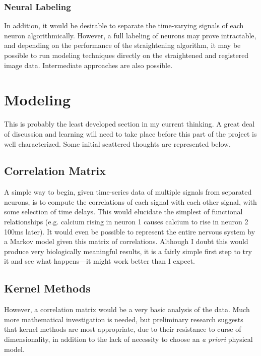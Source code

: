 \documentclass[letter,11pt]{article}
\begin{document}
\subsubsection{Neural Labeling}

In addition, it would be desirable to separate the time-varying signals of each neuron
algorithmically. However, a full labeling of neurons may prove intractable, and depending
on the performance of the straightening algorithm, it may be possible to run modeling
techniques directly on the straightened and registered image data. Intermediate approaches
are also possible.


\section{Modeling}


This is probably the least developed section in my current thinking. A great deal
of discussion and learning will need to take place before this part of the project is
well characterized. Some initial scattered thoughts are represented below.

\subsection{Correlation Matrix}

A simple way to begin, given time-series data of multiple signals from
separated neurons, is to compute the correlations of each signal with each
other signal, with some selection of time delays. This would elucidate the
simplest of functional relationships (e.g. calcium rising in neuron 1 causes
calcium to rise in neuron 2 100ms later).  It would even be possible to
represent the entire nervous system by a Markov model given this matrix of
correlations. Although I doubt this would produce very biologically meaningful
results, it is a fairly simple first step to try it and see what happens---it
might work better than I expect.

\subsection{Kernel Methods}

However, a correlation matrix would be a very basic analysis of the data. Much
more mathematical investigation is needed, but preliminary research suggests
that kernel methods are most appropriate, due to their resistance to curse of
dimensionality, in addition to the lack of necessity to choose an {\em a
priori} physical model.
\end{document}
